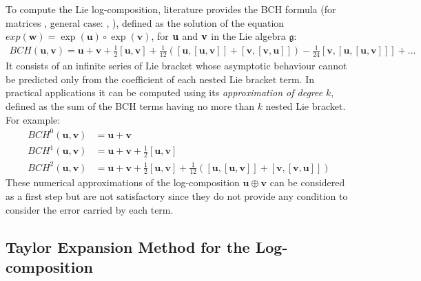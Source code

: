 To compute the Lie log-composition, literature provides the BCH formula (for matrices \cite{hall2015lie}, general case: \cite{klarsfeld1989baker} , \cite{serre2009lie}), defined as the solution of the equation $exp(\mathbf{w}) = \exp(\mathbf{u}) \circ \exp(\mathbf{v})$, for $\bf{u}$ and $\bf{v}$ in the Lie algebra $\mathfrak{g}$:
\begin{align*}
	BCH(\mathbf{u},\mathbf{v}) 
	= 
	\mathbf{u} + \mathbf{v} + \frac{1}{2}[\mathbf{u},\mathbf{v}] + \frac{1}{12}([\mathbf{u},[\mathbf{u},\mathbf{v}]]
	+ [\mathbf{v},[\mathbf{v},\mathbf{u}]]) - \frac{1}{24}[\mathbf{v},[\mathbf{u},[\mathbf{u},\mathbf{v}]]] +... 
\end{align*}
It consists of an infinite series of Lie bracket whose asymptotic behaviour cannot be predicted only from the coefficient of each nested Lie bracket term. In practical applications it can be computed using its \emph{approximation of degree} $k$, defined as the sum of the BCH terms having no more than $k$ nested Lie bracket. For example:
\begin{align*}
BCH^{0}(\mathbf{u},\mathbf{v}) &= \mathbf{u} + \mathbf{v} \\
BCH^{1}(\mathbf{u},\mathbf{v}) &=  \mathbf{u} + \mathbf{v} + \frac{1}{2}[\mathbf{u},\mathbf{v}] \\
BCH^{2}(\mathbf{u},\mathbf{v}) &=  \mathbf{u} + \mathbf{v} + \frac{1}{2}[\mathbf{u},\mathbf{v}] + \frac{1}{12}([\mathbf{u},[\mathbf{u},\mathbf{v}]] + [\mathbf{v},[\mathbf{v},\mathbf{u}]])
\end{align*}
These numerical approximations of the log-composition $\mathbf{u}\oplus \mathbf{v}$ can be considered as a first step but are not satisfactory since they do not provide any condition to consider the error carried by each term.


\subsection{Taylor Expansion Method for the Log-composition}\label{se:taylor_expansion}

